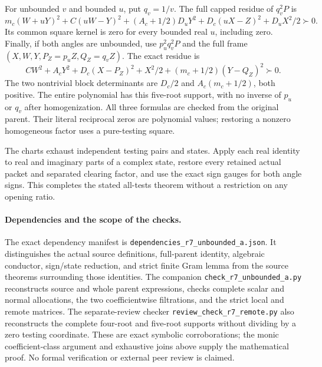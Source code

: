 For unbounded $v$ and bounded $u$, put $q_v=1/v$. The full capped
residue of $q_v^2P$ is
\[
 m_c(W+uY)^2+C(uW-Y)^2+(A_c+1/2)D_uY^2
                         +D_c(uX-Z)^2+D_uX^2/2\succ0.           \tag{RU29}
\]
Its common square kernel is zero for every bounded real $u$,
including zero. Finally, if both angles are unbounded, use
$p_u^2q_v^2P$ and the full frame
$(X,W,Y,P_Z=p_uZ,Q_Z=q_vZ)$. The exact residue is
\[
 CW^2+A_cY^2+D_c(X-P_Z)^2+X^2/2
                           +(m_c+1/2)(Y-Q_Z)^2\succ0.           \tag{RU30}
\]
The two nontrivial block determinants are $D_c/2$ and
$A_c(m_c+1/2)$, both positive. The entire polynomial has this
five-root support, with no inverse of $p_u$ or $q_v$ after
homogenization. All three formulas are checked from the original
parent. Their literal reciprocal zeros are polynomial values;
restoring a nonzero homogeneous factor uses a pure-testing square.

The charts exhaust independent testing pairs and states. Apply each
real identity to real and imaginary parts of a complex state, restore
every retained actual packet and separated clearing factor, and use
the exact sign gauges for both angle signs. This completes the stated
all-tests theorem without a restriction on any opening ratio.

\paragraph{Dependencies and the scope of the checks.}
The exact dependency manifest is
\texttt{dependencies\_r7\_unbounded\_a.json}. It distinguishes the
actual source definitions, full-parent identity, algebraic conductor,
sign/state reduction, and strict finite Gram lemma from the source
theorems surrounding those identities. The companion
\texttt{check\_r7\_unbounded\_a.py} reconstructs source and whole
parent expressions, checks complete scalar and normal allocations,
the two coefficientwise filtrations, and the strict local and remote
matrices. The separate-review checker
\texttt{review\_check\_r7\_remote.py} also reconstructs the complete
four-root and five-root supports without dividing by a zero testing
coordinate. These are exact symbolic corroborations; the monic
coefficient-class argument and exhaustive joins above supply the
mathematical proof. No formal verification or external peer review
is claimed.
